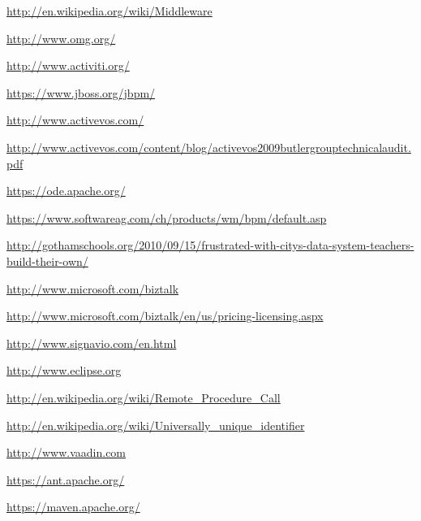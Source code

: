 \documentclass[paper=a4,twoside=false,BCOR=0mm,DIV=calc,fontsize=12pt]{scrartcl}
\begin{document}
\begin{thebibliography}{99}

 \url{}

 \url{}


 \url{}

 \url{}

 \url{}

 \url{}

 \url{}

 \url{}

 \url{http://en.wikipedia.org/wiki/Middleware}

 \url{http://www.omg.org/}

 \url{http://www.activiti.org/}

 \url{}

 \url{https://www.jboss.org/jbpm/}

 \url{http://www.activevos.com/}

 \url{http://www.activevos.com/content/blog/activevos2009butlergrouptechnicalaudit.pdf}

 \url{https://ode.apache.org/}

 \url{https://www.softwareag.com/ch/products/wm/bpm/default.asp}

 \url{http://gothamschools.org/2010/09/15/frustrated-with-citys-data-system-teachers-build-their-own/}

 \url{http://www.microsoft.com/biztalk}

 \url{http://www.microsoft.com/biztalk/en/us/pricing-licensing.aspx}

 \url{http://www.signavio.com/en.html}

 \url{http://www.eclipse.org} %

 \url{http://en.wikipedia.org/wiki/Remote_Procedure_Call}

 \url{http://en.wikipedia.org/wiki/Universally_unique_identifier}

 \url{http://www.vaadin.com}

 \url{https://ant.apache.org/}

 \url{https://maven.apache.org/}


\end{thebibliography}
\end{document}
